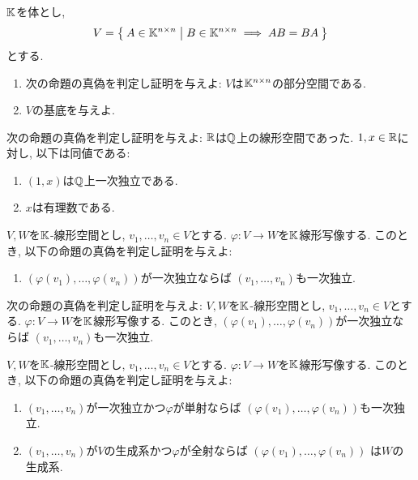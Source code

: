 \begin{quiz}
  $\mathbb{K}$を体とし,
  \begin{align*}
    V=
    \Set{A\in\mathbb{K}^{n\times n} | B\in \mathbb{K}^{n\times n} \implies AB=BA}
  \end{align*}
  とする.
  \begin{enumerate}
  \item
    次の命題の真偽を判定し証明を与えよ:
    $V$は$\mathbb{K}^{n\times n}$の部分空間である.
  \item
    $V$の基底を与えよ.
  \end{enumerate}
\end{quiz}

\begin{quiz}
  次の命題の真偽を判定し証明を与えよ:
  $\mathbb{R}$は$\mathbb{Q}$上の線形空間であった.
  $1,x\in\mathbb{R}$に対し, 以下は同値である:
  \begin{enumerate}
  \item $(1,x)$は$\mathbb{Q}$上一次独立である.
  \item $x$は有理数である.
  \end{enumerate}
\end{quiz}


\begin{quiz}
  $V,W$を$\mathbb{K}$-線形空間とし,
  $v_1,\ldots,v_n\in V$とする.
  $\varphi\colon V\to W$を$\mathbb{K}$線形写像する.
  このとき,
  以下の命題の真偽を判定し証明を与えよ:
  \begin{enumerate}
  \item    
    $(\varphi(v_1),\ldots,\varphi(v_n))$が一次独立ならば
    $(v_1,\ldots,v_n)$も一次独立.
  \end{enumerate}
\end{quiz}

\begin{quiz}
  次の命題の真偽を判定し証明を与えよ:
  $V,W$を$\mathbb{K}$-線形空間とし,
  $v_1,\ldots,v_n\in V$とする.
  $\varphi\colon V\to W$を$\mathbb{K}$線形写像する.
  このとき,
  $(\varphi(v_1),\ldots,\varphi(v_n))$が一次独立ならば
  $(v_1,\ldots,v_n)$も一次独立.
\end{quiz}

\begin{quiz}
  $V,W$を$\mathbb{K}$-線形空間とし,
  $v_1,\ldots,v_n\in V$とする.
  $\varphi\colon V\to W$を$\mathbb{K}$線形写像する.
  このとき,
  以下の命題の真偽を判定し証明を与えよ:
  \begin{enumerate}
  \item    
    $(v_1,\ldots,v_n)$が一次独立かつ$\varphi$が単射ならば
    $(\varphi(v_1),\ldots,\varphi(v_n))$も一次独立.
  \item
    $(v_1,\ldots,v_n)$が$V$の生成系かつ$\varphi$が全射ならば
    $(\varphi(v_1),\ldots,\varphi(v_n))$
    は$W$の生成系.
  \end{enumerate}
\end{quiz}

